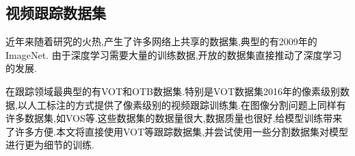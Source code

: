 \subsection{视频跟踪数据集}
近年来随着研究的火热,产生了许多网络上共享的数据集,典型的有2009年的ImageNet\supercite{imagenet_cvpr09}.
由于深度学习需要大量的训练数据,开放的数据集直接推动了深度学习的发展.
\par
在跟踪领域最典型的有VOT\supercite{VOT_TPAMI}和OTB\supercite{WuLimYang13}数据集.特别是VOT数据集2016年的像素级别数据\supercite{Vojir-TR-2017-01},以人工标注的方式提供了像素级别的视频跟踪训练集.在图像分割问题上同样有许多数据集,如VOS\supercite{Cae+17}等.这些数据集的数据量很大,数据质量也很好,给模型训练带来了许多方便.本文将直接使用VOT等跟踪数据集,并尝试使用一些分割数据集对模型进行更为细节的训练.
